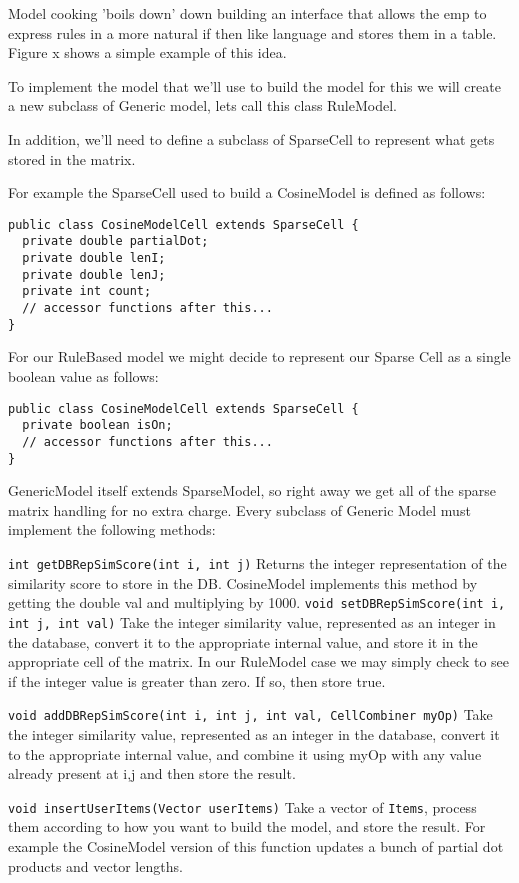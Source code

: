 \documentclass[12pt]{article}
\begin{document}
Model cooking 'boils down' down building an interface that allows the
emp to express rules in a more natural if then like language and
stores them in a table.  Figure x shows a simple example of this idea.

To implement the model that we'll use to build the model for this we
will create a new subclass of Generic model, lets call this class RuleModel.

In addition, we'll need to define a subclass of SparseCell to
represent what gets stored in the matrix.

For example the SparseCell used to build a CosineModel is defined as
follows: 
\begin{lstlisting}
public class CosineModelCell extends SparseCell {
  private double partialDot;
  private double lenI;
  private double lenJ;
  private int count;
  // accessor functions after this...
}
\end{lstlisting}

For our RuleBased model we might decide to represent our Sparse Cell
as a single boolean value as follows:
\begin{lstlisting}
public class CosineModelCell extends SparseCell {
  private boolean isOn;
  // accessor functions after this...
}
\end{lstlisting}

GenericModel itself extends SparseModel, so right away we get all of
the sparse matrix handling for no extra charge. Every subclass of
Generic Model must implement the following methods:

\lstinline$int getDBRepSimScore(int i, int j)$
Returns the integer representation of the similarity score to store in
the DB.  CosineModel implements this method by getting the double val
and multiplying by 1000.
\lstinline$void setDBRepSimScore(int i, int j, int val)$
Take the integer similarity value, represented as an integer in the
database,  convert it to the appropriate internal value, and store it
in the appropriate cell of the matrix.  In our RuleModel case we may
simply check to see if the integer value is greater than zero.  If so,
then store true.

\lstinline$void addDBRepSimScore(int i, int j, int val, CellCombiner myOp)$
Take the integer similarity value, represented as an integer in the
database,  convert it to the appropriate internal value, and combine it
using myOp with any value already present at i,j and then store the
result.

\lstinline$void insertUserItems(Vector userItems)$
Take a vector of \lstinline$Items$, process them according to how you
want to build the model, and store the result.  For example the
CosineModel version of this function updates a bunch of partial dot
products and vector lengths.
\end{document}
